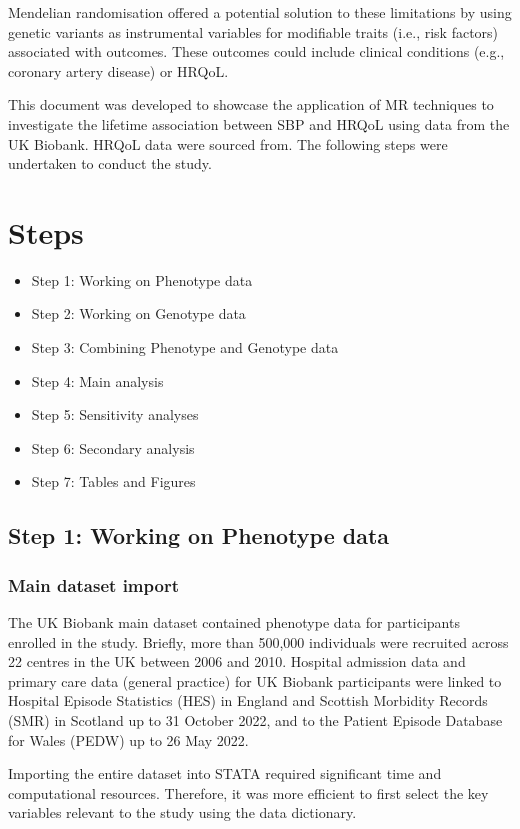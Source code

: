 \documentclass[11pt]{article}
\begin{document}
Mendelian randomisation offered a potential solution to these limitations by using genetic variants as instrumental variables for modifiable traits (i.e., risk factors) associated with outcomes. These outcomes could include clinical conditions (e.g., coronary artery disease) or HRQoL.

This document was developed to showcase the application of MR techniques to investigate the lifetime association between SBP and HRQoL using data from the UK Biobank. HRQoL data were sourced from\cite{sullivan2011catalogue}. The following steps were undertaken to conduct the study.

\section{Steps}

\begin{itemize}
\item Step 1: Working on Phenotype data
\item Step 2: Working on Genotype data 
\item Step 3: Combining Phenotype and Genotype data
\item Step 4: Main analysis
\item Step 5: Sensitivity analyses
\item Step 6: Secondary analysis
\item Step 7: Tables and Figures 
\end{itemize}
\newpage

\subsection{Step 1: Working on Phenotype data}
\subsubsection{Main dataset import}

The UK Biobank main dataset contained phenotype data for participants enrolled in the study. Briefly, more than 500,000 individuals were recruited across 22 centres in the UK between 2006 and 2010\cite{sudlow2015uk}. Hospital admission data and primary care data (general practice) for UK Biobank participants were linked to Hospital Episode Statistics (HES) in England and Scottish Morbidity Records (SMR) in Scotland up to 31 October 2022, and to the Patient Episode Database for Wales (PEDW) up to 26 May 2022.

Importing the entire dataset into STATA required significant time and computational resources. Therefore, it was more efficient to first select the key variables relevant to the study using the data dictionary.
\end{document}
